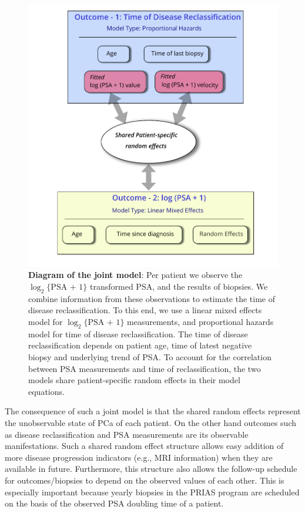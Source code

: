 \begin{figure}[!htb]
\centerline{\includegraphics[width=\columnwidth]{images/jm_blockdiag.pdf}}
\caption{\textbf{Diagram of the joint model}: Per patient we observe the $\log_2\{\mbox{PSA + 1}\}$ transformed PSA, and the results of biopsies. We combine information from these observations to estimate the time of disease reclassification. To this end, we use a linear mixed effects model for $\log_2\{\mbox{PSA + 1}\}$ measurements, and proportional hazards model for time of disease reclassification. The time of disease reclassification depends on patient age, time of latest negative biopsy and underlying trend of PSA. To account for the correlation between PSA measurements and time of reclassification, the two models share patient-specific random effects in their model equations.}
\label{fig:jm_blockdiag}
\end{figure}

The consequence of such a joint model is that the shared random effects represent the unobservable state of PCa of each patient. On the other hand outcomes such as disease reclassification and PSA measurements are its observable manifestations. Such a shared random effect structure allows easy addition of more disease progression indicators (e.g., MRI information) when they are available in future. Furthermore, this structure also allows the follow-up schedule for outcomes/biopsies to depend on the observed values of each other. This is especially important because yearly biopsies in the PRIAS program are scheduled on the basis of the observed PSA doubling time of a patient.

